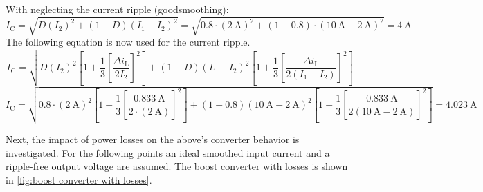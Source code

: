 \begin{solutionblock}
\begin{equation}
     \end{equation}
     With neglecting the current ripple (goodsmoothing):
     \begin{equation}
        I_\mathrm{C}=\sqrt{D (I_\mathrm{2})^2+(1-D)(I_\mathrm{1}-I_\mathrm{2})^2}=\sqrt{0.8\cdot (\SI{2}{\ampere})^2+(1-0.8)\cdot(\SI{10}{\ampere}-\SI{2}{\ampere})^2} = \SI{4}{\ampere}
     \end{equation}
     The following equation is now used for the current ripple.
     \begin{equation}
        I_\mathrm{C}=\sqrt{D (I_\mathrm{2})^2[1+\frac{1}{3}[\frac{\Delta i_\mathrm{L}}{2I_\mathrm{2}}]^2]+(1-D)(I_\mathrm{1}-I_\mathrm{2})^2[1+\frac{1}{3}[\frac{\Delta i_\mathrm{L}}{2(I_\mathrm{1}-I_\mathrm{2})}]^2]} 
    \end{equation}
    \begin{equation}
        I_\mathrm{C}=\sqrt{0.8 \cdot (\SI{2}{\ampere})^2 [1+\frac{1}{3}[\frac{\SI{0.833}{\ampere}}{2\cdot (\SI{2}{\ampere})}]^2]+(1-0.8)(\SI{10}{\ampere}- \SI{2}{\ampere})^2[1+\frac{1}{3}[\frac{\SI{0.833}{\ampere}}{2(\SI{10}{\ampere}- \SI{2}{\ampere})}]^2]}=\SI{4.023}{\ampere}
    \end{equation}
\end{solutionblock}

Next, the impact of power losses on the above's converter behavior is investigated. For the following points an ideal smoothed input current and a ripple-free output voltage are assumed. The boost converter with losses  is shown in \autoref{fig:boost converter with losses}.



